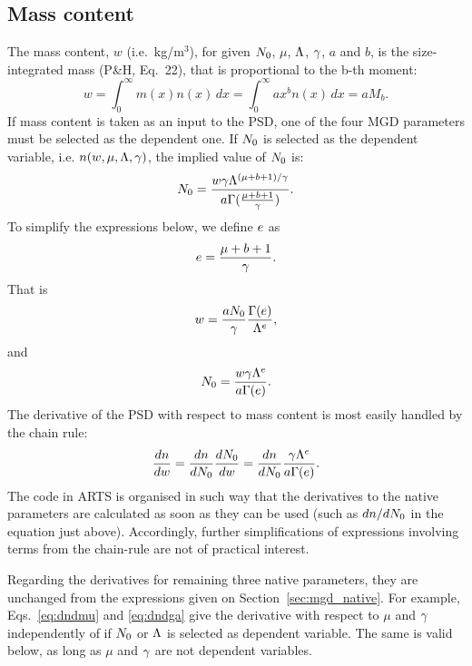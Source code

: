 \subsection{Mass content}
%
The mass content, $w$ (i.e.\ kg/m$^3$), for given $N_0$, $\mu$, $\Lambda$, $\gamma$,
$a$ and $b$, is the size-integrated mass (P\&H, Eq.~22), that is proportional to
the b-th moment:
\begin{equation}
  w = \int_0^\infty m(x) n(x)\, dx = \int_0^\infty ax^b n(x)\, dx = aM_b.
\end{equation}
If mass content is taken as an input to the PSD, one of the four MGD parameters
must be selected as the dependent one. If $N_0$ is selected as the dependent
variable, i.e. $n(w,\mu,\Lambda,\gamma)$, the implied value of $N_0$ is:
\begin{equation}
  N_0 = \frac{w\gamma\Lambda^{(\mu+b+1)/\gamma}}{a\Gamma(\frac{\mu+b+1}{\gamma})}.
\end{equation}
To simplify the expressions below, we define $e$ as
\begin{equation}
  e = \frac{\mu+b+1}{\gamma}.
  \label{eq:eterm}
\end{equation}
That is
\begin{equation}
  w = \frac{aN_0}{\gamma}\frac{\Gamma(e)}{\Lambda^e},
  \label{eq:wfrommomb}
\end{equation}
and
\begin{equation}
  N_0 = \frac{w\gamma\Lambda^e}{a\Gamma(e)}.  
  \label{eq:n0fromw}
\end{equation}
The derivative of the PSD with respect to mass content is most easily handled
by the chain rule:
\begin{equation}
  \frac{dn}{dw} = \frac{dn}{dN_0}\frac{dN_0}{dw} = \frac{dn}{dN_0} 
   \frac{\gamma\Lambda^e}{a\Gamma(e)}.
  \label{eq:dn0dw}
\end{equation}
The code in ARTS is organised in such way that the derivatives to the native
parameters are calculated as soon as they can be used (such as $dn/dN_0$ in the
equation just above). Accordingly, further simplifications of expressions
involving terms from the chain-rule are not of practical interest. 

Regarding the derivatives for remaining three native parameters, they are
unchanged from the expressions given on Section~\ref{sec:mgd_native}. For
example, Eqs.~\ref{eq:dndmu} and \ref{eq:dndga} give the derivative with
respect to $\mu$ and $\gamma$ independently of if $N_0$ or $\Lambda$ is selected as
dependent variable. The same is valid below, as long as $\mu$ and $\gamma$ are not
dependent variables.

